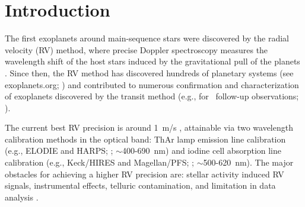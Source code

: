 \chapter{Introduction}

The first exoplanets around main-sequence stars were discovered by the
radial velocity (RV) method, where precise Doppler spectroscopy
measures the wavelength shift of the host stars induced by the
gravitational pull of the planets \citep{1988ApJ...331..902C,
  1989Natur.339...38L, 1993ApJ...413..339H, 1995Natur.378..355M,
  1996ApJ...464L.153B}. Since then, the RV method has discovered
hundreds of planetary systems (see exoplanets.org; \citealt{eod2014})
and contributed to numerous confirmation and characterization of
exoplanets discovered by the transit method (e.g., for
\kepler\ follow-up observations; \citealt{Marcy2014}).

The current best RV precision is around 1~m/s \citep{eprv2015},
attainable via two wavelength calibration methods in the optical band:
ThAr lamp emission line calibration (e.g., ELODIE and HARPS;
\citealt{elodie, harps-s}; $\sim$400-690~nm) and iodine cell
absorption line calibration (e.g., Keck/HIRES and Magellan/PFS;
\citealt{butler1996, 2010SPIE.7735E..53C}; $\sim$500-620~nm). The
major obstacles for achieving a higher RV precision are: stellar
activity induced RV signals, instrumental effects, telluric
contamination, and limitation in data analysis \citep{eprv2015}.